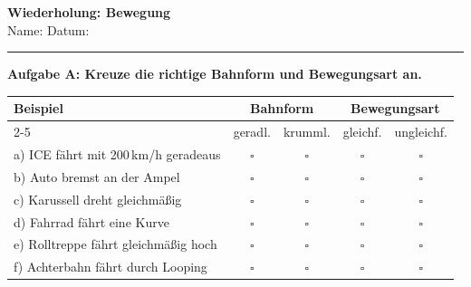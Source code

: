 \documentclass[11pt,a4paper]{article}
\newcommand{\aufgabe}[1]{\noindent\textbf{\textcolor{fachfarbe}{#1}}}
\begin{document}
\noindent
\begin{minipage}[t]{0.82\textwidth}
    \vspace{0pt}
    {\Large\bfseries Wiederholung: Bewegung}\\[0.3em]
    {\small Name: \underline{\hspace{5cm}} \hfill Datum: \underline{\hspace{3cm}}}
\end{minipage}
\hfill
\begin{minipage}[t]{0.15\textwidth}
    \vspace{0pt}
    \raggedleft
    \href{https://devbox42.github.io/sciencesim/physik/kl06/02-bewegung/std-05-wiederholung/LP-05-wiederholung.html}{}
\end{minipage}
\vspace{0.2em}
\hrule
\vspace{0.6em}

\aufgabe{Aufgabe A: Kreuze die richtige Bahnform und Bewegungsart an.}

\vspace{0.3em}
{\small
\begin{tabular}{|p{5.5cm}|c|c|c|c|}
\hline
\textbf{Beispiel} & \multicolumn{2}{c|}{\textbf{Bahnform}} & \multicolumn{2}{c|}{\textbf{Bewegungsart}} \\
\cline{2-5}
 & geradl. & krumml. & gleichf. & ungleichf. \\
\hline
a) ICE fährt mit 200\,km/h geradeaus & $\square$ & $\square$ & $\square$ & $\square$ \\
\hline
b) Auto bremst an der Ampel & $\square$ & $\square$ & $\square$ & $\square$ \\
\hline
c) Karussell dreht gleichmäßig & $\square$ & $\square$ & $\square$ & $\square$ \\
\hline
d) Fahrrad fährt eine Kurve & $\square$ & $\square$ & $\square$ & $\square$ \\
\hline
e) Rolltreppe fährt gleichmäßig hoch & $\square$ & $\square$ & $\square$ & $\square$ \\
\hline
f) Achterbahn fährt durch Looping & $\square$ & $\square$ & $\square$ & $\square$ \\
\hline
\end{tabular}
}
\end{document}
